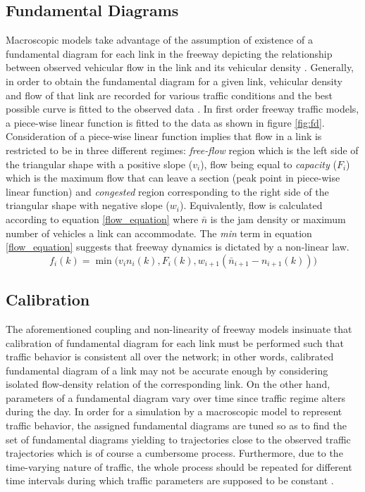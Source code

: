 \documentclass[twocolumn,10pt]{asme2e}
\begin{document}
\subsection{Fundamental Diagrams}
Macroscopic models take advantage of the assumption of existence of a fundamental diagram for each link in the freeway depicting the relationship between observed vehicular flow in the link and its vehicular density \cite{Calibration}. Generally, in order to obtain the fundamental diagram for a given link, vehicular density and flow of that link are recorded for various traffic conditions and the best possible curve is fitted to the observed data \cite{cassidy}. In first order freeway traffic models, a piece-wise linear function is fitted to the data as shown in figure \ref{fig:fd}. Consideration of a piece-wise linear function implies that flow in a link is restricted to be in three different regimes: \textit{free-flow} region which is the left side of the triangular shape with a positive slope ($v_i$), flow being equal to \textit{capacity} ($F_i$) which is the maximum flow that can leave a section (peak point in piece-wise linear function) and \textit{congested} region corresponding to the right side of the triangular shape with negative slope ($w_i$). Equivalently, flow is calculated according to equation \ref{flow_equation} where $\bar{n}$ is the jam density or maximum number of vehicles a link can accommodate. The \textit{min} term in equation \ref{flow_equation} suggests that freeway dynamics is dictated by a non-linear law.
\begin{equation} \label{flow_equation}
f_i(k) = \min \big( v_in_i(k), F_i(k), w_{i+1}(\bar{n}_{i+1} - n_{i+1}(k))\big)
\end{equation}

\subsection{Calibration}
The aforementioned coupling and non-linearity of freeway models insinuate that calibration of fundamental diagram for each link must be performed such that traffic behavior is consistent all over the network; in other words, calibrated fundamental diagram of a link may not be accurate enough by considering isolated flow-density relation of the corresponding link. On the other hand, parameters of a fundamental diagram vary over time since traffic regime alters during the day. In order for a simulation by a macroscopic model to represent traffic behavior, the assigned fundamental diagrams are tuned so as to find the set of fundamental diagrams yielding to trajectories close to the observed traffic trajectories which is of course a cumbersome process. Furthermore, due to the time-varying nature of traffic, the whole process should be repeated for different time intervals during which traffic parameters are supposed to be constant \cite{Calibration}. 
\end{document}
